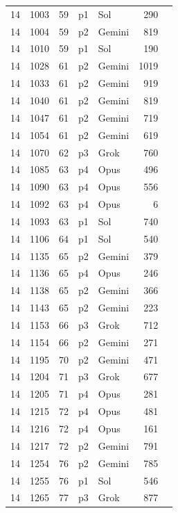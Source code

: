 \begin{longtable}{r r r l l r L{2.3in}}
14 & 1003 & 59 & p1 & Sol & 290 &  \\
14 & 1004 & 59 & p2 & Gemini & 819 &  \\
14 & 1010 & 59 & p1 & Sol & 190 &  \\
14 & 1028 & 61 & p2 & Gemini & 1019 &  \\
14 & 1033 & 61 & p2 & Gemini & 919 &  \\
14 & 1040 & 61 & p2 & Gemini & 819 &  \\
14 & 1047 & 61 & p2 & Gemini & 719 &  \\
14 & 1054 & 61 & p2 & Gemini & 619 &  \\
14 & 1070 & 62 & p3 & Grok & 760 &  \\
14 & 1085 & 63 & p4 & Opus & 496 &  \\
14 & 1090 & 63 & p4 & Opus & 556 &  \\
14 & 1092 & 63 & p4 & Opus & 6 &  \\
14 & 1093 & 63 & p1 & Sol & 740 &  \\
14 & 1106 & 64 & p1 & Sol & 540 &  \\
14 & 1135 & 65 & p2 & Gemini & 379 &  \\
14 & 1136 & 65 & p4 & Opus & 246 &  \\
14 & 1138 & 65 & p2 & Gemini & 366 &  \\
14 & 1143 & 65 & p2 & Gemini & 223 &  \\
14 & 1153 & 66 & p3 & Grok & 712 &  \\
14 & 1154 & 66 & p2 & Gemini & 271 &  \\
14 & 1195 & 70 & p2 & Gemini & 471 &  \\
14 & 1204 & 71 & p3 & Grok & 677 &  \\
14 & 1205 & 71 & p4 & Opus & 281 &  \\
14 & 1215 & 72 & p4 & Opus & 481 &  \\
14 & 1216 & 72 & p4 & Opus & 161 &  \\
14 & 1217 & 72 & p2 & Gemini & 791 &  \\
14 & 1254 & 76 & p2 & Gemini & 785 &  \\
14 & 1255 & 76 & p1 & Sol & 546 &  \\
14 & 1265 & 77 & p3 & Grok & 877 &  \\

\end{longtable}
